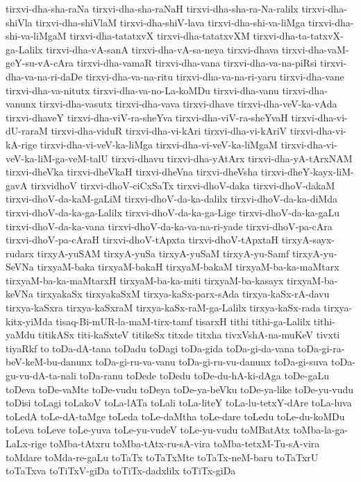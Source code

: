 {tirxvi-dha-sha-raNa
tirxvi-dha-sha-raNaH
tirxvi-dha-sha-ra-Na-ralilx
tirxvi-dha-shiVla
tirxvi-dha-shiVlaM
tirxvi-dha-shiV-lava
tirxvi-dha-shi-va-liMga
tirxvi-dha-shi-va-liMgaM
tirxvi-dha-tatatxvX
tirxvi-dha-tatatxvXM
tirxvi-dha-ta-tatxvX-ga-Lalilx
tirxvi-dha-vA-sanA
tirxvi-dha-vA-sa-neya
tirxvi-dhava
tirxvi-dha-vaM-geY-su-vA-cAra
tirxvi-dha-vamaR
tirxvi-dha-vana
tirxvi-dha-va-na-piRsi
tirxvi-dha-va-na-ri-daDe
tirxvi-dha-va-na-ritu
tirxvi-dha-va-na-ri-yaru
tirxvi-dha-vane
tirxvi-dha-va-nitutx
tirxvi-dha-va-no-La-koMDu
tirxvi-dha-vanu
tirxvi-dha-vanunx
tirxvi-dha-vasutx
tirxvi-dha-vava
tirxvi-dhave
tirxvi-dha-veV-ka-vAda
tirxvi-dhaveY
tirxvi-dha-viV-ra-sheYva
tirxvi-dha-viV-ra-sheYvaH
tirxvi-dha-vi-dU-raraM
tirxvi-dha-viduR
tirxvi-dha-vi-kAri
tirxvi-dha-vi-kAriV
tirxvi-dha-vi-kA-rige
tirxvi-dha-vi-veV-ka-liMga
tirxvi-dha-vi-veV-ka-liMgaM
tirxvi-dha-vi-veV-ka-liM-ga-veM-talU
tirxvi-dhavu
tirxvi-dha-yAtArx
tirxvi-dha-yA-tArxNAM
tirxvi-dheVka
tirxvi-dheVkaH
tirxvi-dheVna
tirxvi-dheVsha
tirxvi-dheY-kayx-liM-gavA
tirxvidhoV
tirxvi-dhoV-ciCxSaTx
tirxvi-dhoV-daka
tirxvi-dhoV-dakaM
tirxvi-dhoV-da-kaM-gaLiM
tirxvi-dhoV-da-ka-dalilx
tirxvi-dhoV-da-ka-diMda
tirxvi-dhoV-da-ka-ga-Lalilx
tirxvi-dhoV-da-ka-ga-Lige
tirxvi-dhoV-da-ka-gaLu
tirxvi-dhoV-da-ka-vana
tirxvi-dhoV-da-ka-va-na-ri-yade
tirxvi-dhoV-pa-cAra
tirxvi-dhoV-pa-cAraH
tirxvi-dhoV-tApxta
tirxvi-dhoV-tApxtaH
tirxyA-sayx-rudarx
tirxyA-yuSAM
tirxyA-yuSa
tirxyA-yuSaM
tirxyA-yu-Samf
tirxyA-yu-SeVNa
tirxyaM-baka
tirxyaM-bakaH
tirxyaM-bakaM
tirxyaM-ba-ka-maMtarx
tirxyaM-ba-ka-maMtarxH
tirxyaM-ba-ka-miti
tirxyaM-ba-kasayx
tirxyaM-ba-keVNa
tirxyakaSx
tirxyakaSxM
tirxya-kaSx-parx-sAda
tirxya-kaSx-rA-davu
tirxya-kaSxra
tirxya-kaSxraM
tirxya-kaSx-raM-ga-Lalilx
tirxya-kaSx-rada
tirxya-kitx-yiMda
tisaq-Bi-mUR-la-maM-tirx-tamf
tisarxH
tithi
tithi-ga-Lalilx
tithi-yaMdu
titikASx
titi-kaSxteV
titikeSx
titxde
titxha
tivxVshA-na-muKeV
tivxti
tiyaRkf
to
toDa-dA-tana
toDadu
toDagi
toDa-gida
toDa-gi-da-vana
toDa-gi-ra-beV-keM-bu-danunx
toDa-gi-ru-va-vanu
toDa-gi-ru-vu-danunx
toDa-gi-suva
toDa-gu-vu-dA-ta-nali
toDa-ranu
toDede
toDedu
toDe-du-hA-ki-dAga
toDe-gaLu
toDeva
toDe-vaMte
toDe-vudu
toDeya
toDe-ya-beVku
toDe-ya-like
toDe-yu-vudu
toDisi
toLagi
toLakoV
toLa-lATa
toLali
toLa-liteY
toLa-lu-tetxY-dAre
toLa-luva
toLedA
toLe-dA-taMge
toLeda
toLe-daMtha
toLe-dare
toLedu
toLe-du-koMDu
toLeva
toLeve
toLe-yuva
toLe-yu-vudeV
toLe-yu-vudu
toMBatAtx
toMba-la-ga-LaLx-rige
toMba-tAtxru
toMba-tAtx-ru-sA-vira
toMba-tetxM-Tu-sA-vira
toMdare
toMda-re-gaLu
toTaTx
toTaTxMte
toTaTx-neM-baru
toTaTxrU
toTaTxva
toTiTxV-giDa
toTiTx-dadxlilx
toTiTx-giDa
}
